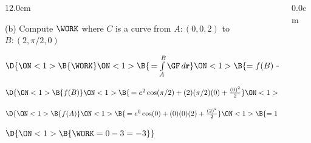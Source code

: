 %
\begin{frame}
\begin{columns}\begin{column}{12.0cm}

\vspace{0.1cm}

\scriptsize

(b) Compute $\WORK$ \quad where $C$ is a curve from $A:(0,0,2)$ to $B:\left(2,\pi/2,0\right)$

\vspace{0.2cm}


\begin{center}
	$\D{
	\ON<1>{\B{\WORK }}
	\ON<1>{\B{\, = \int \limits_{A}^{B} \GF \, d{\bf r}}}
	\ON<1>{\B{ = f(B) - f(A)}}
	}$
\end{center}


\vspace{0.3cm}

\quad $\D{
\ON<1>{\B{f(B) }}
\ON<1>{\B{\, = e^{2}\cos(\pi/2) + (2)(\pi/2)(0) + \frac{(0)^2}{2}}}
\ON<1>{\B{ = 0}}}$

\quad $\D{
\ON<1>{\B{f(A) }}
\ON<1>{\B{\, = e^{0}\cos(0) + (0)(0)(2) + \frac{(2)^2}{2}}}
\ON<1>{\B{= 1+2=3}}}$

\vspace{0.3cm}


\vspace{0.3cm}

\quad $\D{
\ON<1>{\B{\WORK = 0 - 3 = -3}}}$

\vspace{7.5cm}
	
\end{column}\begin{column}{0.0cm}\end{column}\end{columns}
\end{frame}
%
